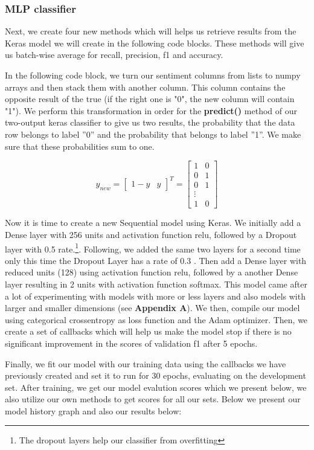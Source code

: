 \documentclass[10pt]{article}
\begin{document}
\newpage
\subsubsection*{MLP classifier}

Next, we create four new methods which will helps us retrieve results from the Keras model we will create in the following code blocks. These methods will give us batch-wise average for recall, precision, f1 and accuracy. 

In the following code block, we turn our sentiment columns from lists to numpy arrays and then stack them with another column. This column contains the opposite result of the true (if the right one is "0", the new column will contain "1"). We perform this transformation in order for the \textbf{predict()} method of our two-output keras classifier to give us two results, the probability that the data row belongs to label ''0'' and the probability that belongs to label ''1''. We make sure that these probabilities sum to one.

\[
y_{new} = \begin{bmatrix} 1-y & y  \end{bmatrix}^T =  \begin{bmatrix} 1 & 0\\ 0 & 1\\ 0  & 1\\ \vdots \\ 1 & 0 \end{bmatrix}
\]

Now it is time to create a new Sequential model using Keras. We initially add a Dense layer with 256 units and activation function relu, followed by a Dropout layer with 0.5 rate.\footnote{The dropout layers help our classifier from overfitting}. Following, we added the same two layers for a second time only this time the Dropout Layer has a rate of 0.3 . Then add a Dense layer with reduced units (128) using activation function relu, followed by a another Dense layer resulting in 2 units with activation function softmax. This model came after a lot of experimenting with models with more or less layers and also models with larger and smaller dimensions (see \textbf{Appendix A}). We then, compile our model using categorical crossentropy as loss function and the Adam optimizer. Then, we create a set of callbacks which will help us make the model stop if there is no significant improvement in the scores of validation f1 after 5 epochs. 

Finally, we fit our model with our training data using the callbacks we have previously created and set it to run for 30 epochs, evaluating on the development set. 
After training, we get our model evalution scores which we present below, we also utilize our own methods to get scores for all our sets. Below we present our model history graph and also our results below:
\end{document}
